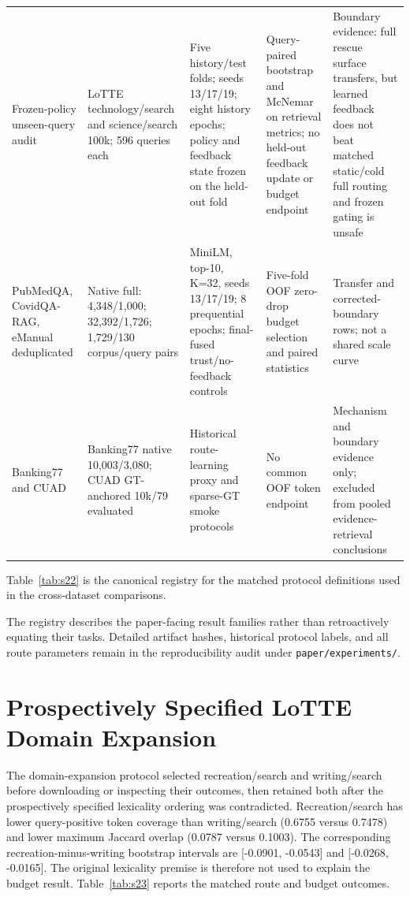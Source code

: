 \begin{table}[tbp]
\begin{tabularx}{\textwidth}{>{\raggedright\arraybackslash}X>{\raggedright\arraybackslash}X>{\raggedright\arraybackslash}X>{\raggedright\arraybackslash}X>{\raggedright\arraybackslash}X}
Frozen-policy unseen-query audit & LoTTE technology/search and science/search 100k; 596 queries each & Five history/test folds; seeds 13/17/19; eight history epochs; policy and feedback state frozen on the held-out fold & Query-paired bootstrap and McNemar on retrieval metrics; no held-out feedback update or budget endpoint & Boundary evidence: full rescue surface transfers, but learned feedback does not beat matched static/cold full routing and frozen gating is unsafe \\
PubMedQA, CovidQA-RAG, eManual deduplicated & Native full: 4,348/1,000; 32,392/1,726; 1,729/130 corpus/query pairs & MiniLM, top-10, K=32, seeds 13/17/19; 8 prequential epochs; final-fused trust/no-feedback controls & Five-fold OOF zero-drop budget selection and paired statistics & Transfer and corrected-boundary rows; not a shared scale curve \\
Banking77 and CUAD & Banking77 native 10,003/3,080; CUAD GT-anchored 10k/79 evaluated & Historical route-learning proxy and sparse-GT smoke protocols & No common OOF token endpoint & Mechanism and boundary evidence only; excluded from pooled evidence-retrieval conclusions \\
\bottomrule
\end{tabularx}
\end{table}

Table~\ref{tab:s22} is the canonical registry for the matched protocol definitions used in the cross-dataset comparisons.

The registry describes the paper-facing result families rather than retroactively equating their tasks. Detailed artifact hashes, historical protocol labels, and all route parameters remain in the reproducibility audit under \nolinkurl{paper/experiments/}.

\section{Prospectively Specified LoTTE Domain Expansion}
\label{sec:12-appendix:prospectively-specified-lotte-domain-expansion}

The domain-expansion protocol selected recreation/search and writing/search before downloading or inspecting their outcomes, then retained both after the prospectively specified lexicality ordering was contradicted. Recreation/search has lower query-positive token coverage than writing/search (0.6755 versus 0.7478) and lower maximum Jaccard overlap (0.0787 versus 0.1003). The corresponding recreation-minus-writing bootstrap intervals are [-0.0901, -0.0543] and [-0.0268, -0.0165]. The original lexicality premise is therefore not used to explain the budget result. Table~\ref{tab:s23} reports the matched route and budget outcomes.

